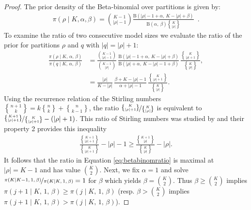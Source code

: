 \documentclass[11pt,a4paper]{article}
\theoremstyle{definition} %
\theoremstyle{case}
\newcommand{\FBeta}[2]{\text{B}\left({#1},\ {#2}\right)}
\DeclareRobustCommand{\stirling}{\genfrac\{\}{0pt}{}}
\begin{document}
\begin{proof}
The prior density of the Beta-binomial over partitions is given by:
\begin{align*}
    \pi\left(\rho \mid K, \alpha, \beta\right) = \binom{K - 1}{|\rho| - 1} 
    \frac{\FBeta{|\rho| - 1 + \alpha}{K - |\rho| + \beta}}
    {\FBeta{\alpha}{\beta}\stirling{K}{|\rho|}} \enspace .
\end{align*}
To examine the ratio of two consecutive model sizes we evaluate the ratio of the prior for partitions $\rho$ and $q$ with $|q| = |\rho|+1$:
\begin{align}\label{eq:betabinomratio}
    \frac{
        \pi\left(\rho \mid K,\,\alpha,\,\beta\right)
    }{
        \pi\left(q \mid K,\,\alpha,\,\beta\right)
    }
    &= 
    \frac{\binom{K - 1}{|\rho| - 1}}{\binom{K - 1}{|\rho|}}
    \,
    \frac{
        \FBeta{|\rho| - 1 + \alpha}{K - |\rho| + \beta}
    }{
        \FBeta{|\rho| + \alpha}{K - |\rho| - 1 + \beta}
    }
    \,
    \frac{\stirling{K}{|\rho|+1}}{\stirling{K}{|\rho|}},
    \\
    &= 
    \frac{|\rho|}{K - |\rho|}
    \,
    \frac{\beta +K-|\rho| -1}{\alpha +|\rho| -1}
    \,
    \frac{\stirling{K}{|\rho|+1}}{\stirling{K}{|\rho|}}.
\end{align}
Using the recurrence relation of the Stirling numbers $\stirling{n+1}{k} = k\stirling{n}{k} + \stirling{n}{k-1}$, the ratio $\nicefrac{\stirling{K}{|\rho|+1}}{\stirling{K}{|\rho|}}$ is equivalent to $\nicefrac{\stirling{K+1}{|\rho|+1}}{\stirling{K}{|\rho|+1}} - (|\rho|+1)$.
This ratio of Stirling numbers was studied by \textcite{berg1975some} and their property 2 provides this inequality
\begin{align*}
    \frac{\stirling{K+1}{|\rho|+1}}{\stirling{K}{|\rho|+1}} - |\rho| - 1 
    \geq
    \frac{\stirling{K+1}{|\rho|}}{\stirling{K}{|\rho|}} - |\rho|.
\end{align*}
It follows that the ratio in Equation \eqref{eq:betabinomratio} is maximal at $|\rho| = K-1$ and has value $\binom{K}{2}$.
Next, we fix $\alpha=1$ and solve $\nicefrac{
        \pi\left(K \mid K-1,\,1,\,\beta\right)
    }{
        \pi\left(K \mid K,\,1,\,\beta\right)
    } = 1$ for $\beta$ which yields $\beta = \binom{K}{2}$.
Thus $\beta\geq \binom{K}{2}$ implies $\pi\left(j+1 \mid K,\,1,\,\beta\right)\geq\pi\left(j \mid K,\,1,\,\beta\right)$ (resp. $\beta > \binom{K}{2}$ implies $\pi\left(j+1 \mid K,\,1,\,\beta\right) > \pi\left(j \mid K,\,1,\,\beta\right)$).
\end{proof}
\end{document}
